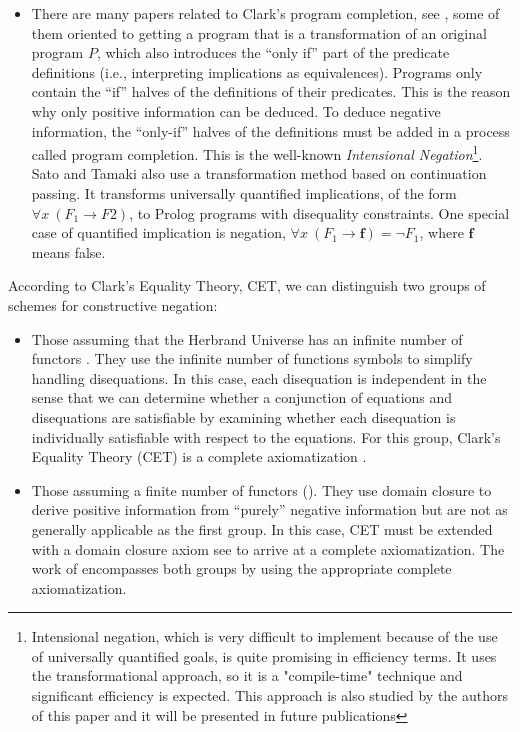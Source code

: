 \documentclass{tlp}
\newcommand{\false}{\mathbf{f}}
\begin{document}
\begin{itemize}
\item There are many papers related to Clark's \cite{Clark} program
  completion, see \cite{Lloyd,Apt}, some of them
  \cite{Barbuti1,Barbuti2} oriented to getting a program that is a
  transformation of an original program $P$, which also introduces the
  ``only if'' part of the predicate definitions (i.e., interpreting
  implications as equivalences). Programs only contain the ``if''
  halves of the definitions of their predicates. This is the reason
  why only positive information can be deduced. To deduce negative
  information, the ``only-if'' halves of the definitions must be added
  in a process called program completion. This is the well-known
  \emph{Intensional Negation}\footnote{Intensional negation, which is
  very difficult to implement because of the use of universally
  quantified goals, is quite promising in efficiency terms.  It uses
  the transformational approach, so it is a "compile-time" technique
  and significant efficiency is expected. This approach is also
  studied by the authors of this paper and it will be presented in
  future publications}. Sato and Tamaki \cite{SatoT} also use a
  transformation method based on continuation passing. It transforms
  universally quantified implications, of the form $ \forall x~(F_1
  \rightarrow F2)$, to Prolog programs with disequality
  constraints. One special case of quantified implication is negation,
  $\forall x~(F_1 \rightarrow \false)= \neg F_1$, where $\false$ means
  false.

\end{itemize}

According to Clark's Equality Theory, CET, \cite{Clark} we can
distinguish two groups of schemes for constructive negation:

\begin{itemize}

\item Those assuming that the Herbrand Universe has an infinite number
of functors \cite{Chan1,Wallace,Sato91}. They use the infinite
number of functions symbols to simplify handling disequations. In this
case, each disequation is independent in the sense that we can
determine whether a conjunction of equations and disequations are
satisfiable by examining whether each disequation is individually
satisfiable with respect to the equations. For this group, Clark's
Equality Theory (CET) \cite{Clark} is a complete axiomatization
\cite{Maher}.

\item Those assuming a finite number of functors (\cite{Malus,Foo}).
They use domain closure to derive positive information from
``purely'' negative information but are not as generally applicable as
the first group. In this case, CET must be extended with a domain
closure axiom see \cite{Maher} to arrive at a complete
axiomatization. The work of \cite{Drabent} encompasses both groups by
using the appropriate complete axiomatization.
\end{itemize}
\end{document}
